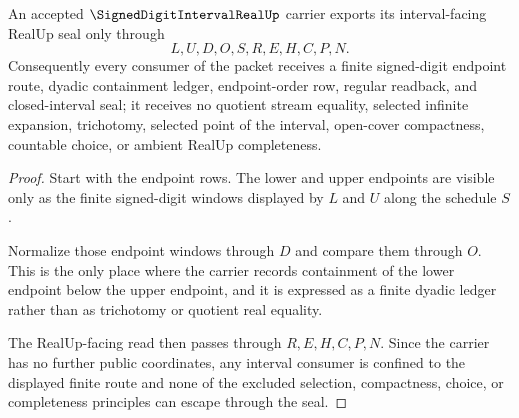 \begin{theorem}
\label{thm:signed-digit-interval-real-seal-nonescape}
An accepted $\SignedDigitIntervalRealUp$ carrier exports its interval-facing RealUp seal only through
$$
L,U,D,O,S,R,E,H,C,P,N.
$$
Consequently every consumer of the packet receives a finite signed-digit endpoint route, dyadic containment ledger, endpoint-order row, regular readback, and closed-interval seal; it receives no quotient stream equality, selected infinite expansion, trichotomy, selected point of the interval, open-cover compactness, countable choice, or ambient RealUp completeness.
\end{theorem}
\begin{proof}
Start with the endpoint rows. The lower and upper endpoints are visible only as the finite signed-digit windows displayed by $L$ and $U$ along the schedule $S$.

Normalize those endpoint windows through $D$ and compare them through $O$. This is the only place where the carrier records containment of the lower endpoint below the upper endpoint, and it is expressed as a finite dyadic ledger rather than as trichotomy or quotient real equality.

The RealUp-facing read then passes through $R,E,H,C,P,N$. Since the carrier has no further public coordinates, any interval consumer is confined to the displayed finite route and none of the excluded selection, compactness, choice, or completeness principles can escape through the seal.
\end{proof}

